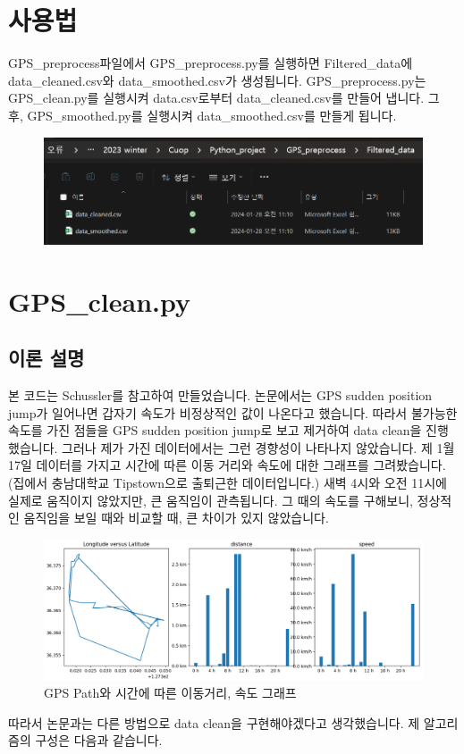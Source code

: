 \documentclass{oblivoir}
\begin{document}
  \section{사용법}
  GPS\_preprocess파일에서 GPS\_preprocess.py를 실행하면 Filtered\_data에 data\_cleaned.csv와 data\_smoothed.csv가 생성됩니다.
  GPS\_preprocess.py는 GPS\_clean.py를 실행시켜 data.csv로부터 data\_cleaned.csv를 만들어 냅니다.
  그 후, GPS\_smoothed.py를 실행시켜 data\_smoothed.csv를 만들게 됩니다.
  \begin{figure}[H]
    \includegraphics[width=\textwidth]{GPS_preprocess_2.png}
  \end{figure}

  \section{GPS\_clean.py}
  \subsection{이론 설명}
  본 코드는 Schussler\cite{Schussler}를 참고하여 만들었습니다.
  논문에서는 GPS sudden position jump가 일어나면 갑자기 속도가 비정상적인 값이 나온다고 했습니다.
  따라서 불가능한 속도를 가진 점들을 GPS sudden position jump로 보고 제거하여 data clean을 진행했습니다.
  그러나 제가 가진 데이터에서는 그런 경향성이 나타나지 않았습니다.
  제 1월 17일 데이터를 가지고 시간에 따른 이동 거리와 속도에 대한 그래프를 그려봤습니다.(집에서 충남대학교 Tipstown으로 출퇴근한 데이터입니다.)
  새벽 4시와 오전 11시에 실제로 움직이지 않았지만, 큰 움직임이 관측됩니다.
  그 때의 속도를 구해보니, 정상적인 움직임을 보일 때와 비교할 때, 큰 차이가 있지 않았습니다.
  \begin{figure}[H]
    \caption{GPS Path와 시간에 따른 이동거리, 속도 그래프}
    \includegraphics[width=\textwidth]{GPS_preprocess_3.png}
  \end{figure}
  따라서 논문과는 다른 방법으로 data clean을 구현해야겠다고 생각했습니다.\newline
  제 알고리즘의 구성은 다음과 같습니다.
\end{document}
